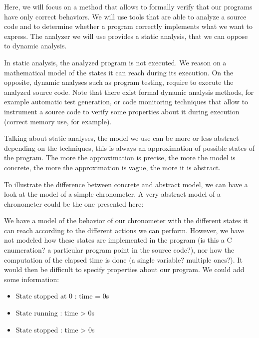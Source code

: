 Here, we will focus on a method that allows to formally verify that our
programs have only correct behaviors. We will use tools that are able to
analyze a source code and to determine whether a program correctly
implements what we want to express. The analyzer we will use provides a
static analysis, that we can oppose to dynamic analysis.



In static analysis, the analyzed program is not executed. We reason on a
mathematical model of the states it can reach during its execution. On
the opposite, dynamic analyses such as program testing, require to
execute the analyzed source code. Note that there exist formal dynamic
analysis methods, for example automatic test generation, or code
monitoring techniques that allow to instrument a source code to verify
some properties about it during execution (correct memory use, for
example).



Talking about static analyses, the model we use can be more or less
abstract depending on the techniques, this is always an approximation of
possible states of the program. The more the approximation is precise,
the more the model is concrete, the more the approximation is vague, the
more it is abstract.



To illustrate the difference between concrete and abstract model, we can
have a look at the model of a simple chronometer. A very abstract model of
a chronometer could be the one presented here:





We have a model of the behavior of our chronometer with the different
states it can reach according to the different actions we can perform.
However, we have not modeled how these states are implemented in the
program (is this a C enumeration? a particular program point in the
source code?), nor how the computation of the elapsed time is done (a single
variable? multiple ones?). It would then be difficult to specify
properties about our program. We could add some information:


\begin{itemize}
\item State stopped at 0 : time = 0s
\item State running : time > 0s
\item State stopped : time > 0s
\end{itemize}



